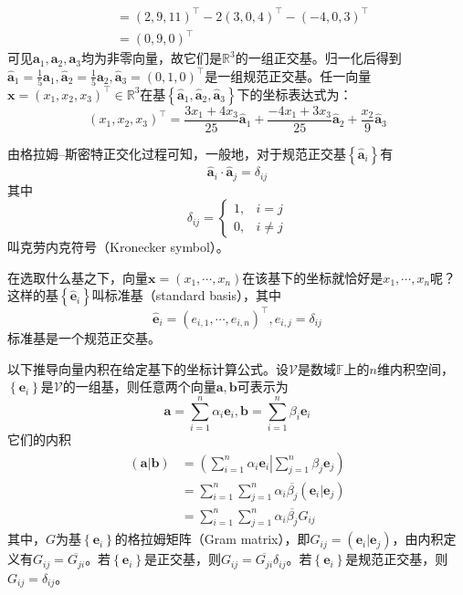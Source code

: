 \documentclass[../main.tex]{subfiles}
\begin{document}
\begin{example}
\begin{align*}
                     & =\left(2,9,11\right)^\intercal-2\left(3,0,4\right)^\intercal-\left(-4,0,3\right)^\intercal                                                                                                                                                                                                                                                                           \\
                     & =\left(0,9,0\right)^\intercal
    \end{align*}
    可见$\mathbf{a}_1,\mathbf{a}_2,\mathbf{a}_3$均为非零向量，故它们是$\mathbb{R}^3$的一组正交基。归一化后得到$\mathbf{\hat{a}}_1=\frac{1}{5}\mathbf{a}_1,\mathbf{\hat{a}}_2=\frac{1}{5}\mathbf{a}_2,\mathbf{\hat{a}}_3=\left(0,1,0\right)^\intercal$是一组规范正交基。任一向量$\mathbf{x}=\left(x_1,x_2,x_3\right)^\intercal\in\mathbb{R}^3$在基$\left\{\mathbf{\hat{a}}_1,\mathbf{\hat{a}}_2,\mathbf{\hat{a}}_3\right\}$下的坐标表达式为：
    \[\left(x_1,x_2,x_3\right)^\intercal=\frac{3x_1+4x_3}{25}\mathbf{\hat{a}}_1+\frac{-4x_1+3x_3}{25}\mathbf{\hat{a}}_2+\frac{x_2}{9}\mathbf{\hat{a}}_3\]

    由格拉姆--斯密特正交化过程可知，一般地，对于规范正交基$\left\{\mathbf{\hat{a}}_i\right\}$有
    \[\mathbf{\hat{a}}_i\cdot\mathbf{\hat{a}}_j=\delta_{ij}\]
    其中
    \[\delta_{ij}=\left\{\begin{array}{ll}
            1, & i=j     \\
            0, & i\neq j
        \end{array}\right.
    \]
    叫克劳内克符号（Kronecker symbol）。

    在选取什么基之下，向量$\mathbf{x}=\left(x_1,\cdots,x_n\right)$在该基下的坐标就恰好是$x_1,\cdots,x_n$呢？这样的基$\left\{\mathbf{\hat{e}}_i\right\}$叫标准基（standard basis），其中
    \[\mathbf{\hat{e}}_i=\left(e_{i,1},\cdots,e_{i,n}\right)^\intercal,e_{i,j}=\delta_{ij}\]
    标准基是一个规范正交基。
\end{example}

以下推导向量内积在给定基下的坐标计算公式。设$\mathcal{V}$是数域$\mathbb{F}$上的$n$维内积空间，$\left\{\mathbf{e}_i\right\}$是$\mathcal{V}$的一组基，则任意两个向量$\mathbf{a},\mathbf{b}$可表示为
\[
    \mathbf{a}=\sum_{i=1}^n\alpha_i\mathbf{e}_i,\mathbf{b}=\sum_{i=1}^n\beta_i\mathbf{e}_i
\]
它们的内积
\begin{align*}
    \left(\mathbf{a}|\mathbf{b}\right) & =\left(\sum_{i=1}^n\alpha_i\mathbf{e}_i\right|\left.\sum_{j=1}^n\beta_j\mathbf{e}_j\right) \\
                                       & =\sum_{i=1}^n\sum_{j=1}^n\alpha_i\overline{\beta_j}\left(\mathbf{e}_i|\mathbf{e}_j\right)  \\
                                       & =\sum_{i=1}^n\sum_{j=1}^n\alpha_i\overline{\beta_j}G_{ij}
\end{align*}
其中，$G$为基$\left\{\mathbf{e}_i\right\}$的格拉姆矩阵（Gram matrix），即$G_{ij}=\left(\mathbf{e}_i|\mathbf{e}_j\right)$，由内积定义有$G_{ij}=\overline{G_{ji}}$。若$\left\{\mathbf{e}_i\right\}$是正交基，则$G_{ij}=\overline{G_{ji}}\delta_{ij}$。若$\left\{\mathbf{e}_i\right\}$是规范正交基，则$G_{ij}=\delta_{ij}$。
\end{document}
